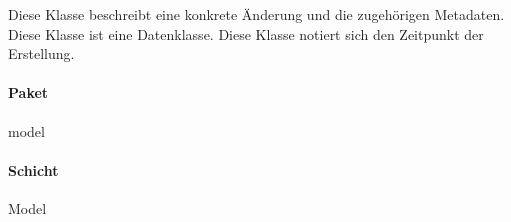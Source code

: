 Diese Klasse beschreibt eine konkrete Änderung und die zugehörigen Metadaten.
Diese Klasse ist eine Datenklasse.
Diese Klasse notiert sich den Zeitpunkt der Erstellung.

\paragraph*{Paket}
model

\paragraph*{Schicht}
Model